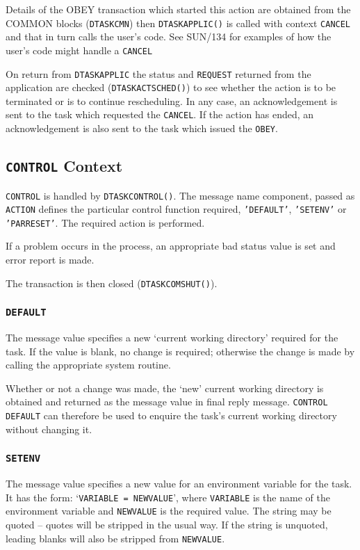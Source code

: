 \documentclass[twoside,11pt]{article}
\newcommand{\xref}[3]{#1}
\renewcommand{\_}{\texttt{\symbol{95}}}
\begin{document}
Details of the OBEY transaction which started this action are obtained from
the COMMON blocks (\texttt{DTASK\_CMN}) then \texttt{DTASK\_APPLIC()} is called
with context \texttt{CANCEL} and that in turn calls the user's code.
See
\xref{SUN/134}{sun134}{}
for examples of how the user's code might handle a
\texttt{CANCEL}

On return from \texttt{DTASK\_APPLIC} the status and \texttt{REQUEST} returned
from the application are checked (\texttt{DTASK\_ACT\_SCHED()}) to see whether
the action is to be terminated or is to continue rescheduling. 
In any case, an acknowledgement is sent to the task which requested the
\texttt{CANCEL}. 
If the action has ended, an acknowledgement is also sent to the task which
issued the \texttt{OBEY}.

\subsection{\label{control_context}\texttt{CONTROL} Context}
\texttt{CONTROL} is handled by \texttt{DTASK\_CONTROL()}.
The message name component, passed as \texttt{ACTION} defines the particular
control function required, \texttt{'DEFAULT'}, \texttt{'SETENV'} or
\texttt{'PAR\_RESET'}.
The required action is performed. 

If a problem occurs in the process, an appropriate bad status value is set
and error report is made.

The transaction is then closed (\texttt{DTASK\_COMSHUT()}).

\subsubsection{\texttt{DEFAULT}}
The message value specifies a new `current working directory' required for the
task. If the value is blank, no change is required; otherwise the change is
made by calling the appropriate system routine.

Whether or not a change was made, the `new' current working directory is
obtained and returned as the message value in final reply message.
\texttt{CONTROL DEFAULT} can therefore be used to enquire the task's current
working directory without changing it.

\subsubsection{\texttt{SETENV}}
The message value specifies a new value for an environment variable for the
task. It has the form: `\texttt{VARIABLE = NEWVALUE}', where \texttt{VARIABLE}
is the name of the environment variable and \texttt{NEWVALUE} is the required
value. The string may be quoted -- quotes will be stripped in the usual way.
If the string is unquoted, leading blanks will also be stripped from
\texttt{NEWVALUE}.
\end{document}
